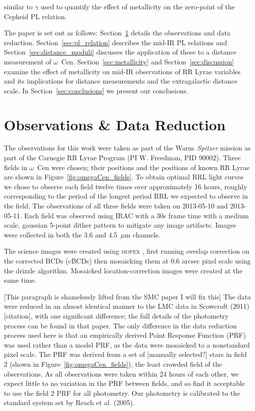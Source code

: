 \documentclass[a4paper,fleqn,usenatbib]{mnras}
\begin{document}
similar to $\gamma$ used to quantify the effect of metallicity on the zero-point of the Cepheid PL relation. 

The paper is set out as follows: Section~\ref{sec:observations} details the observations and data reduction. Section~\ref{sec:pl_relation} describes the mid-IR PL relations and Section~\ref{sec:distance_moduli} discusses the application of these to a distance measurement of  $\omega$~Cen. Section~\ref{sec:metallicity} and Section~\ref{sec:discussion} examine the effect of metallicity on mid-IR observations of RR Lyrae variables and its implications for distance measurements and the extragalactic distance scale. In Section~\ref{sec:conclusions} we present our conclusions.


\section{Observations \& Data Reduction}
\label{sec:observations}
The observations for this work were taken as part of the Warm~\textit{Spitzer} mission as part of the Carnegie RR Lyrae Program (PI W. Freedman, PID 90002). Three fields in $\omega$~Cen were chosen; their positions and the positions of known RR Lyrae are shown in Figure~\ref{fig:omegaCen_fields}. To obtain optimal RRL light curves we chose to observe each field twelve times over approximately 16 hours, roughly corresponding to the period of the longest period RRL we expected to observe in the field. The observations of all three fields were taken on 2013-05-10 and 2013-05-11. Each field was observed using IRAC \citep{2004ApJS..154...10F} with a 30s frame time with a medium scale, gaussian 5-point dither pattern to mitigate any image artifacts. Images were collected in both the 3.6 and 4.5~$\mu$m channels. 

The science images were created using \textsc{mopex} \citep{2006SPIE.6274E..0CM}, first running overlap correction on the corrected BCDs (cBCDs) then mosaicking them at 0.6 arcsec pixel scale using the drizzle algorithm. Mosaicked location-correction images were created at the same time. 

[This paragraph is shamelessly lifted from the SMC paper I will fix this]
The data were reduced in an almost identical manner to the LMC data in Scowcroft (2011) [citation], with one significant difference; the full details of the photometry process can be found in that paper. The only difference in the data reduction process used here is that an empirically derived Point Response Function (PRF) was used rather than a model PRF, as the data were mosaicked to a nonstandard pixel scale. The PRF was derived from a set of [manually selected?] stars in field 2 (shown in Figure~\ref{fig:omegaCen_fields}), the least crowded field of the observations. As all observations were taken within 24 hours of each other, we expect little to no variation in the PRF between fields, and so find it acceptable to use the field 2 PRF for all photometry. Our photometry is calibrated to the standard system set by Reach et al. (2005).
\end{document}
